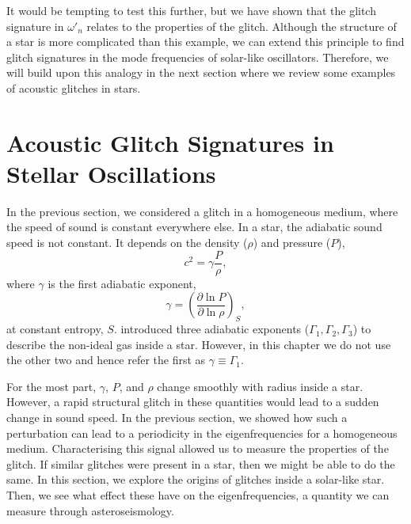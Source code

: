 
It would be tempting to test this further, but we have shown that the glitch signature in \(\omega'_n\) relates to the properties of the glitch. Although the structure of a star is more complicated than this example, we can extend this principle to find glitch signatures in the mode frequencies of solar-like oscillators. Therefore, we will build upon this analogy in the next section where we review some examples of acoustic glitches in stars.



\section[Acoustic Glitches in Stars]{Acoustic Glitch Signatures in Stellar Oscillations}\label{sec:glitch-star}

In the previous section, we considered a glitch in a homogeneous medium, where the speed of sound is constant everywhere else. In a star, the adiabatic sound speed is not constant. It depends on the density (\(\rho\)) and pressure (\(P\)),
%
\begin{equation}
    c^2 = \gamma \frac{P}{\rho},\label{eq:sound}
\end{equation}
%
where \(\gamma\) is the first adiabatic exponent,
%
\begin{equation}
    \gamma = \left( \frac{\partial \ln P}{\partial \ln \rho} \right)_S,
\end{equation}
%
at constant entropy, \(S\). \citet{Chandrasekhar1939} introduced three adiabatic exponents (\(\Gamma_1,\Gamma_2,\Gamma_3\)) to describe the non-ideal gas inside a star. However, in this chapter we do not use the other two and hence refer the first as \(\gamma \equiv \Gamma_1\).

For the most part, \(\gamma\), \(P\), and \(\rho\) change smoothly with radius inside a star. However, a rapid structural glitch in these quantities would lead to a sudden change in sound speed. In the previous section, we showed how such a perturbation can lead to a periodicity in the eigenfrequencies for a homogeneous medium. Characterising this signal allowed us to measure the properties of the glitch. If similar glitches were present in a star, then we might be able to do the same. In this section, we explore the origins of glitches inside a solar-like star. Then, we see what effect these have on the eigenfrequencies, a quantity we can measure through asteroseismology.


